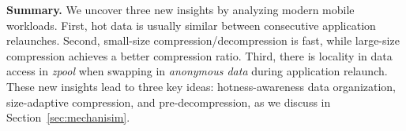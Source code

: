 \noindent\textbf{Summary.} We uncover three new insights by analyzing modern mobile workloads. First, hot data is usually similar between consecutive application relaunches.
Second, small-size compression/decompression is fast, while large-size compression achieves a better compression ratio.
Third, there is locality in data access in  \emph{zpool} when swapping in \emph{anonymous data} during application relaunch.
These new insights lead to three key ideas: hotness-awareness data organization, size-adaptive compression, and pre-decompression, as we discuss in Section~\ref{sec:mechanisim}. 
